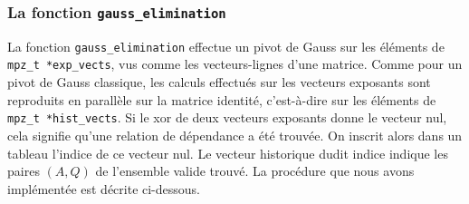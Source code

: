 \subsubsection{La fonction \texttt{gauss\_elimination}}

La fonction \texttt{gauss\_elimination} effectue un pivot de Gauss sur les
éléments de \texttt{mpz\_t *exp\_vects}, vus comme les vecteurs-lignes
d'une matrice. Comme pour un pivot de Gauss classique, les calculs effectués
sur les vecteurs exposants sont reproduits en parallèle sur la matrice identité,
c'est-à-dire sur les éléments de \texttt{mpz\_t *hist\_vects}. Si le xor de deux
vecteurs exposants donne le vecteur nul, cela 
signifie qu'une relation de dépendance a été trouvée. On inscrit alors dans un
tableau l'indice de ce vecteur nul. Le vecteur historique dudit indice indique 
les paires $(A,Q)$ de l'ensemble valide trouvé. La procédure que nous avons
implémentée est décrite ci-dessous. 

